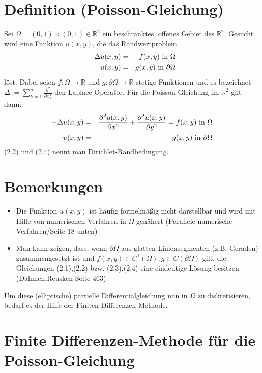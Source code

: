 \section{Definition (Poisson-Gleichung)}\label{s.Poisson-Gleichung}

Sei $\Omega = (0,1)\times(0,1) \in \mathbb{R}^{2}$ ein beschränktes, offenes Gebiet des $\mathbb{R}^{2}$. Gesucht wird eine Funktion $u(x,y)$, die das Randwertproblem
\begin{eqnarray}
	-\Delta u(x,y) &=& f(x,y) \textnormal{ in } \Omega \\
    u(x,y) &=& g(x,y) \textnormal{ in } \partial \Omega
\end{eqnarray}
löst.
Dabei seien $f: \Omega \rightarrow \mathbb{R}$ und $g: \partial\Omega \rightarrow \mathbb{R}$ stetige Funktionen und es bezeichnet $\Delta := \sum\limits_{k=1}^{n} \frac {\partial^{2}} {\partial x_{k}^{2}}$ den Laplace-Operator. Für die Poisson-Gleichung im $\mathbb{R}^{2}$ gilt dann:
\begin{eqnarray}
	-\Delta u(x,y) &=& \frac {\partial^{2} u(x,y)} {\partial x^{2}} + \frac {\partial^{2} u(x,y)} {\partial y^{2}} = f(x,y) \textnormal{ in } \Omega \\
    u(x,y) &=& g(x,y) \textnormal{ in } \partial \Omega
\end{eqnarray}
(2.2) und (2.4) nennt man Dirichlet-Randbedingung.

\section{Bemerkungen}\label{s.Bemerkungen zur Poisson-Gleichung}

\begin{itemize}
\item Die Funktion $u(x,y)$ ist häufig formelmäßig nicht darstellbar und wird mit Hilfe von numerischen Verfahren in $\Omega$ genähert (Parallele numerische Verfahren/Seite 18 unten)
\item Man kann zeigen, dass, wenn $\partial \Omega$ aus glatten Liniensegmenten (z.B. Geraden) zusammengesetzt ist und $f(x,y) \in C^{1}(\Omega), g \in C(\partial \Omega)$ gilt, die Gleichungen (2.1),(2.2) bzw. (2.3),(2.4) eine eindeutige Lösung besitzen (Dahmen,Reusken Seite 463).
\end{itemize}

Um diese (elliptische) partielle Differentialgleichung nun in $\Omega$ zu diskretisieren, bedarf es der Hilfe der Finiten Differenzen Methode.

\section{Finite Differenzen-Methode für die Poisson-Gleichung}\label{s.Finite Differenzen}

